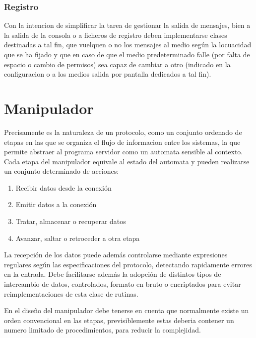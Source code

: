 \documentclass[a4paper,spanish,12pt]{book}
\begin{document}
\subsubsection{Registro}
Con la intencion de simplificar la tarea de gestionar la salida de mensajes, bien a la salida de la consola o a ficheros de registro deben implementarse clases destinadas a tal fin, que vuelquen o no los mensajes al medio según la locuacidad que se ha fijado y que en caso de que el medio predeterminado falle (por falta de espacio o cambio de permisos) sea capaz de cambiar a otro (indicado en la configuracion o a los medios salida por pantalla dedicados a tal fin).

\section{Manipulador}
Precisamente es la naturaleza de un protocolo, como un conjunto ordenado de etapas en las que se organiza el flujo de informacion entre los sistemas, la que permite abstraer al programa servidor como un automata sensible al contexto. Cada etapa del manipulador equivale al estado del automata y pueden realizarse un conjunto determinado de acciones:
\begin{enumerate}
	\item Recibir datos desde la conexión
	\item Emitir datos a la conexión
	\item Tratar, almacenar o recuperar datos
	\item Avanzar, saltar o retroceder a otra etapa
\end{enumerate}

La recepción de los datos puede además controlarse mediante expresiones regulares según las especificaciones del protocolo, detectando rapidamente errores en la entrada. Debe facilitarse además la adopción de distintos tipos de intercambio de datos, controlados, formato en bruto o encriptados para evitar reimplementaciones de esta clase de rutinas.

En el diseño del manipulador debe tenerse en cuenta que normalmente existe un orden convencional en las etapas, previsiblemente estas deberia contener un numero limitado de procedimientos, para reducir la complejidad.
\end{document}
